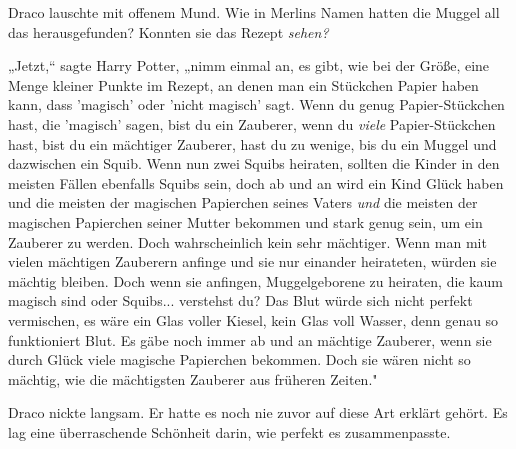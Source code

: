 {Draco lauschte mit offenem Mund. Wie in Merlins Namen hatten die Muggel all das herausgefunden? Konnten sie das Rezept \emph{sehen?}

„Jetzt,“ sagte Harry Potter, „nimm einmal an, es gibt, wie bei der Größe, eine Menge kleiner Punkte im Rezept, an denen man ein Stückchen Papier haben kann, dass 'magisch' oder 'nicht magisch' sagt. Wenn du genug Papier-Stückchen hast, die 'magisch' sagen, bist du ein Zauberer, wenn du \emph{viele} Papier-Stückchen hast, bist du ein mächtiger Zauberer, hast du zu wenige, bis du ein Muggel und dazwischen ein Squib. Wenn nun zwei Squibs heiraten, sollten die Kinder in den meisten Fällen ebenfalls Squibs sein, doch ab und an wird ein Kind Glück haben und die meisten der magischen Papierchen seines Vaters \emph{und} die meisten der magischen Papierchen seiner Mutter bekommen und stark genug sein, um ein Zauberer zu werden. Doch wahrscheinlich kein sehr mächtiger. Wenn man mit vielen mächtigen Zauberern anfinge und sie nur einander heirateten, würden sie mächtig bleiben. Doch wenn sie anfingen, Muggelgeborene zu heiraten, die kaum magisch sind oder Squibs... verstehst du? Das Blut würde sich nicht perfekt vermischen, es wäre ein Glas voller Kiesel, kein Glas voll Wasser, denn genau so funktioniert Blut. Es gäbe noch immer ab und an mächtige Zauberer, wenn sie durch Glück viele magische Papierchen bekommen. Doch sie wären nicht so mächtig, wie die mächtigsten Zauberer aus früheren Zeiten."

Draco nickte langsam. Er hatte es noch nie zuvor auf diese Art erklärt gehört. Es lag eine überraschende Schönheit darin, wie perfekt es zusammenpasste.

}
